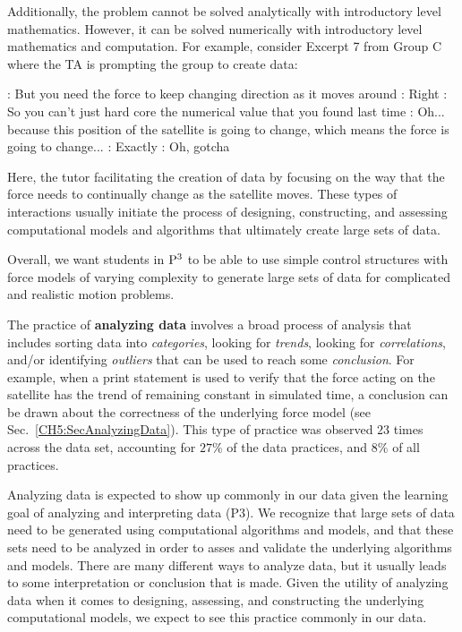 \documentclass{msuphddissertation}
\begin{document}
\begin{doublespace}
Additionally, the problem cannot be solved analytically with introductory level mathematics.  However, it can be solved numerically with introductory level mathematics and computation.  For example, consider Excerpt 7 from Group C where the TA is prompting the group to create data: \begin{description}
\TA: But you need the force to keep changing direction as it moves around
\SC: Right
\TA: So you can't just hard core the numerical value that you found last time
\SC: Oh... because this {position of the satellite} is going to change, which means the force is going to change...
\TA: Exactly
\SB: Oh, gotcha
\end{description}  Here, the tutor facilitating the creation of data by focusing on the way that the force needs to continually change as the satellite moves.  These types of interactions usually initiate the process of designing, constructing, and assessing computational models and algorithms that ultimately create large sets of data.

Overall, we want students in ${\rm P}^{3}$ to be able to use simple control structures with force models of varying complexity to generate large sets of data for complicated and realistic motion problems.

The practice of \textbf{analyzing data} involves a broad process of analysis that includes sorting data into \textit{categories}, looking for \textit{trends}, looking for \textit{correlations}, and/or identifying \textit{outliers} that can be used to reach some \textit{conclusion}.  For example, when a print statement is used to verify that the force acting on the satellite has the trend of remaining constant in simulated time, a conclusion can be drawn about the correctness of the underlying force model (see Sec.~\ref{CH5:SecAnalyzingData}).  This type of practice was observed $23$ times across the data set, accounting for $27\%$ of the data practices, and $8\%$ of all practices.

Analyzing data is expected to show up commonly in our data given the learning goal of analyzing and interpreting data (P3).  We recognize that large sets of data need to be generated using computational algorithms and models, and that these sets need to be analyzed in order to asses and validate the underlying algorithms and models.  There are many different ways to analyze data, but it usually leads to some interpretation or conclusion that is made.  Given the utility of analyzing data when it comes to designing, assessing, and constructing the underlying computational models, we expect to see this practice commonly in our data.


\end{doublespace}
\end{document}
